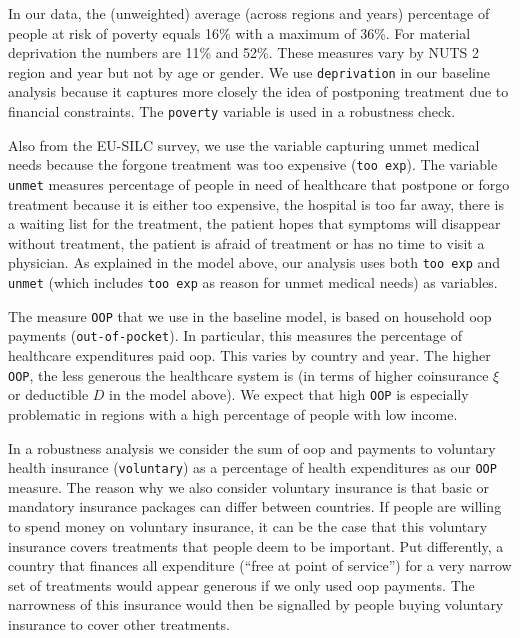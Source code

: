 \documentclass[a4paper,12pt]{article}
\begin{document}
In our data, the (unweighted) average (across regions and years) percentage of people at risk of poverty equals 16\% with a maximum of 36\%. For material deprivation the numbers are 11\% and 52\%. These measures vary by NUTS 2 region and year but not by age or gender. We use \texttt{deprivation} in our baseline analysis because it captures more closely the idea of postponing treatment due to financial constraints. The \texttt{poverty} variable is used in a robustness check.

Also from the EU-SILC survey, we use the variable capturing unmet medical needs because the forgone treatment was too expensive (\texttt{too exp}). The variable \texttt{unmet} measures percentage of people in need of healthcare that postpone or forgo treatment because it is either too expensive, the hospital is too far away, there is a waiting list for the treatment, the patient hopes that symptoms will disappear without treatment, the patient is afraid of treatment or has no time to visit a physician. As explained in the model above, our analysis uses both \texttt{too exp}  and \texttt{unmet} (which includes \texttt{too exp} as reason for unmet medical needs) as variables.

The measure \texttt{OOP} that we use in the baseline model, is based on household oop payments (\texttt{out-of-pocket}). In particular, this measures the percentage of healthcare expenditures paid oop. This varies by country and year. The higher \texttt{OOP}, the less generous the healthcare system is (in terms of higher coinsurance \(\xi\) or deductible \(D\) in the model above). We expect that high \texttt{OOP} is especially problematic in regions with a high percentage of people with low income.

In a robustness analysis we consider the sum of oop and payments to voluntary health insurance (\texttt{voluntary}) as a percentage of health expenditures as our \texttt{OOP} measure. The reason why we also consider voluntary insurance is that basic or mandatory insurance packages can differ between countries. If people are willing to spend money on voluntary insurance, it can be the case that this voluntary insurance covers treatments that people deem to be important. Put differently, a country that finances all expenditure (``free at point of service'') for a very narrow set of treatments would appear generous if we only used oop payments. The narrowness of this insurance would then be signalled by people buying voluntary insurance to cover other treatments. 
\end{document}
